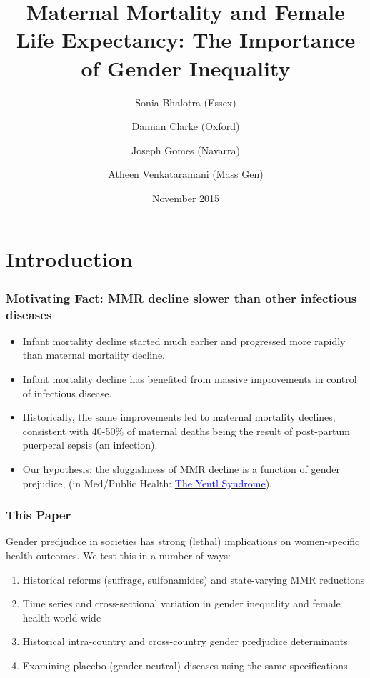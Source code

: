 \documentclass[10pt,letterpaper,subeqn]{beamer}
\title[Women's Health and Gender Inequality]{Maternal Mortality and Female Life 
Expectancy: The Importance of Gender Inequality}
\author[Bhalotra et al.]{Sonia Bhalotra (Essex)
    \and Damian Clarke (Oxford) \\ \vspace{1mm}
    \and Joseph Gomes (Navarra)
    \and Atheen Venkataramani (Mass Gen)}
\date{November 2015}
\begin{document}
\begin{frame}
\titlepage
\end{frame}



\section{Introduction}
\begin{frame}[label=intro]
\frametitle{Motivating Fact: MMR decline slower than other infectious diseases}
\begin{itemize}
  \setlength{\itemsep}{10pt}
	\item Infant mortality decline started much earlier and progressed more rapidly 
        than maternal mortality decline.
	\item Infant mortality decline has benefited from massive improvements in 
        control of infectious disease. 
	\item Historically, the same improvements led to maternal mortality declines, 
        consistent with 40-50\% of maternal deaths being the result of post-partum
        puerperal sepsis (an infection).
  \item Our hypothesis: the sluggishness of MMR decline is a function of gender 
        prejudice, (in Med/Public Health: \hyperlink{Yentl}{\textcolor{blue}
        {The Yentl Syndrome}}).
\end{itemize}
\end{frame}

\begin{frame}
\frametitle{This Paper}
Gender predjudice in societies has strong (lethal) implications on women-specific 
health outcomes.  We test this in a number of ways:
\vspace{5mm}
\begin{enumerate}
  \setlength{\itemsep}{10pt}
	\item Historical reforms (suffrage, sulfonamides) and state-varying MMR reductions
  \item Time series and cross-sectional variation in gender inequality and female
        health world-wide
  \item Historical intra-country and cross-country gender predjudice determinants
  \item Examining placebo (gender-neutral) diseases using the same specifications
\end{enumerate}
\end{frame}
\end{document}
